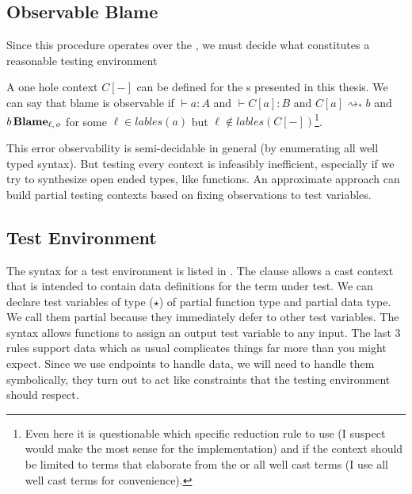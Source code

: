 \subsection{Observable Blame}
Since this procedure operates over the \clang{}, we must decide what constitutes a reasonable testing environment
 
A one hole context $C[-]$ can be defined for the \clang{}s presented in this thesis.
We can say that blame is observable if $\vdash a:A$ and $\vdash C[a]:B$ and $C[a]\rightsquigarrow_{*}b$ and $b\,\textbf{Blame}{}_{\ell, \,o}$ for some $\ell \in lables\left(a\right)$ but $\ell \notin lables\left(C[-]\right)$\footnote{
 Even here it is questionable which specific reduction rule to use (I suspect \cbv{} would make the most sense for the implementation) and if the context should be limited to terms that elaborate from the \slang{} or all well cast terms (I use all well cast terms for convenience).
}.
 
This error observability is semi-decidable in general (by enumerating all well typed syntax).
But testing every context is infeasibly inefficient, especially if we try to synthesize open ended types, like functions.
An approximate approach can build partial testing contexts based on fixing observations to test variables.
 
 
\subsection{Test Environment}
The syntax for a test environment is listed in .
The clause allows a cast context that is intended to contain data definitions for the term under test.
We can declare test variables of type ($\star$) of partial function type and partial data type.
We call them partial because they immediately defer to other test variables.
The syntax allows functions to assign an output test variable to any input.
The last 3 rules support data which as usual complicates things far more than you might expect.
Since we use endpoints to handle data, we will need to handle them symbolically, they turn out to act like constraints that the testing environment should respect.

